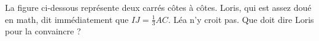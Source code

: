 
\begin{exercice}\label{exo2smath-0056}

    La figure ci-dessous représente deux carrés côtes à côtes. Loris, qui est assez doué en math, dit immédiatement que \( IJ=\frac{1}{ 3 }AC\). Léa n'y croit pas. Que doit dire Loris pour la convaincre ?

    \begin{center}
   
    \end{center}

\end{exercice}

